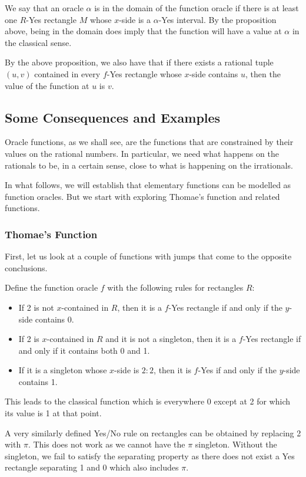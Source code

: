 \documentclass[12pt]{article}
\theoremstyle{remark}
\begin{document}
We say that an oracle $\alpha$ is in the domain of the function oracle if there is at least one $R$-Yes rectangle $M$ whose $x$-side is a $\alpha$-Yes interval. By the proposition above, being in the domain does imply that the function will have a value at $\alpha$ in the classical sense. 

By the above proposition, we also have that if there exists a rational tuple $(u,v)$ contained in every $f$-Yes rectangle whose $x$-side contains $u$, then the value of the function at $u$ is $v$.


\subsection{Some Consequences and Examples}

Oracle functions, as we shall see, are the functions that are constrained by their values on the rational numbers. In particular, we need what happens on the rationals to be, in a certain sense, close to what is happening on the irrationals. 

In what follows, we will establish that elementary functions can be modelled as function oracles. But we start with exploring Thomae's function and related functions.


\subsubsection{Thomae's Function}

First, let us look at a couple of functions with jumps that come to the opposite conclusions. 

Define the function oracle $f$ with the following rules for rectangles $R$: 

\begin{itemize}
    \item If 2 is not $x$-contained in $R$, then it is a $f$-Yes rectangle if and only if the $y$-side contains 0. 
    \item If 2 is $x$-contained in $R$ and it is not a singleton, then it is a $f$-Yes rectangle if and only if it contains both 0 and 1.
    \item If it is a singleton whose $x$-side is $2:2$, then it is $f$-Yes if and only if the $y$-side contains 1. 
\end{itemize}

This leads to the classical function which is everywhere 0 except at 2 for which its value is 1 at that point. 

A very similarly defined Yes/No rule on rectangles can be obtained by replacing 2 with $\pi$. This does not work as we cannot have the $\pi$ singleton. Without the singleton, we fail to satisfy the separating property as there does not exist a Yes rectangle separating 1 and 0 which also includes $\pi$.  
\end{document}
